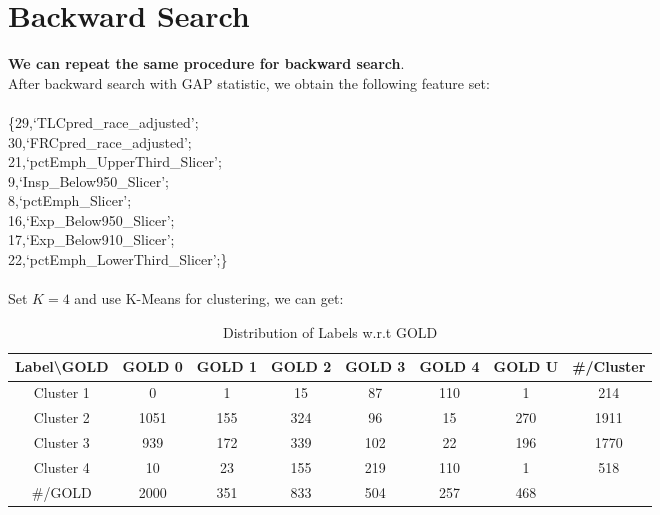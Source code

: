 \documentclass[11pt]{article}
\begin{document}
\section{Backward Search}
\textbf{We can repeat the same procedure for backward search}.\\
After backward search with GAP statistic, we obtain the following feature set:\\
\\
\{29,`TLCpred\_race\_adjusted';\\
30,`FRCpred\_race\_adjusted';\\
21,`pctEmph\_UpperThird\_Slicer';\\
9,`Insp\_Below950\_Slicer';\\
8,`pctEmph\_Slicer';\\
16,`Exp\_Below950\_Slicer';\\
17,`Exp\_Below910\_Slicer';\\
22,`pctEmph\_LowerThird\_Slicer';\}\\
\\
Set $K=4$ and use K-Means for clustering, we can get:\\
\begin{table}[ht]
\caption{Distribution of Labels w.r.t GOLD}
\centering
\begin{tabular}{c c c c c c c|c}
\hline\hline
Label\textbackslash GOLD & GOLD 0 & GOLD 1 & GOLD 2 & GOLD 3 & GOLD 4 & GOLD U & \#/Cluster\\[1ex]
\hline
Cluster 1 & 0 & 1 & 15 & 87 & 110 & 1 & 214\\
Cluster 2 & 1051 & 155 & 324 & 96 & 15 & 270 & 1911\\
Cluster 3 & 939 & 172 & 339 & 102 & 22 & 196 & 1770\\
Cluster 4 & 10 & 23 & 155 & 219 & 110 & 1 & 518\\
\hline
\#/GOLD & 2000 & 351 & 833 & 504 & 257 & 468\\[1ex]
\hline
\end{tabular}
\label{table:dist_cluster_labels_gold_2}
\end{table}

\end{document}
